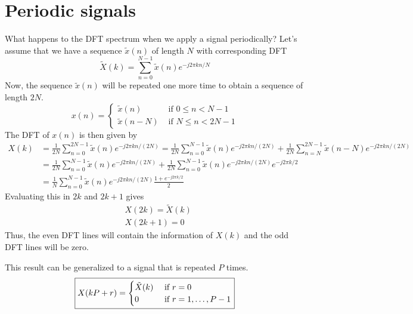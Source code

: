 \section{Periodic signals}
What happens to the DFT spectrum when we apply a signal periodically? Let's assume that we have a sequence $\tilde{x}(n)$ of length $N$ with corresponding DFT
\begin{equation*}
    \tilde{X}(k) = \sum_{n=0}^{N-1} \tilde{x}(n) e^{-j 2\pi k n/N}
\end{equation*}
Now, the sequence $\tilde{x}(n)$ will be repeated one more time to obtain a sequence of length $2N$.
\begin{equation*}
    x(n) = \begin{cases}
        \tilde{x}(n) &\text{ if } 0 \leq n < N - 1\\
        \tilde{x}(n-N) &\text{ if } N \leq n < 2N - 1
    \end{cases}
\end{equation*}
The DFT of $x(n)$ is then given by
\begin{align*}
    X(k) &= \frac{1}{2N}\sum_{n=0}^{2 N-1} \tilde{x}(n) e^{-j 2\pi k n/(2N)} = \frac{1}{2N}\sum_{n=0}^{N-1} \tilde{x}(n) e^{-j 2\pi k n/(2N)} + \frac{1}{2N}\sum_{n=N}^{2N-1} \tilde{x}(n-N) e^{-j 2\pi k n/(2N)} \\
    &= \frac{1}{2N}\sum_{n=0}^{N-1} \tilde{x}(n) e^{-j 2\pi k n/(2N)} + \frac{1}{2N}\sum_{n=0}^{N-1} \tilde{x}(n) e^{-j 2\pi k n/(2N)}  e^{-j 2\pi k/2} \\
    &= \frac{1}{N}\sum_{n=0}^{N-1} \tilde{x}(n) e^{-j 2\pi k n/(2N)} \frac{1+e^{-j 2\pi k/2}}{2}
    \end{align*}
Evaluating this in $2k$ and $2k+1$ gives
\begin{align*}
    &X(2k) = \tilde{X}(k)\\
    &X(2k+1) = 0
\end{align*}
Thus, the even DFT lines will contain the information of $X(k)$ and the odd DFT lines will be zero.

This result can be generalized to a signal that is repeated $P$ times.
\begin{equation*}
\boxed{
    X(kP+r) =
    \begin{cases}
        \tilde{X}(k) &\text{ if } r = 0\\
        0 & \text{ if } r = 1,\ldots,P-1\\
    \end{cases}
}
\end{equation*}

